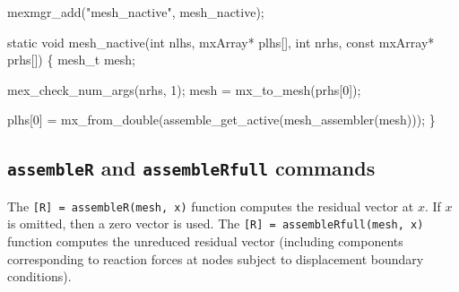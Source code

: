 \nwenddocs{}\endmoddef
mexmgr_add("mesh_nactive", mesh_nactive);
\nwendcode{}\nwdocspar

\nwenddocs{}\endmoddef
static void mesh_nactive(int nlhs, mxArray* plhs[],
                         int nrhs, const mxArray* prhs[])
\{
    mesh_t mesh;

    mex_check_num_args(nrhs, 1);
    mesh = mx_to_mesh(prhs[0]);

    plhs[0] = mx_from_double(assemble_get_active(mesh_assembler(mesh)));
\}

\nwendcode{}\nwdocspar


\subsection{{\tt{}assemble{}R} and {\tt{}assemble{}R{}full} commands}

The {\tt{}[R]\ =\ assemble{}R(mesh,\ x)} function computes the
residual vector at $x$.  If $x$ is omitted, then a zero 
vector is used.  The {\tt{}[R]\ =\ assemble{}R{}full(mesh,\ x)} function
computes the unreduced residual vector (including components
corresponding to reaction forces at nodes subject to
displacement boundary conditions).

